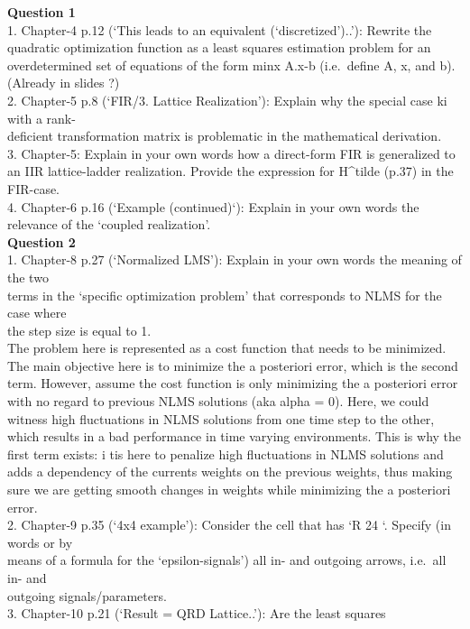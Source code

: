 \documentclass[
  a4paper,
  ,captions=tableheading
]{scrartcl}
\begin{document}
\textbf{Question 1}\\
1. Chapter-4 p.12 (`This leads to an equivalent (`discretized')..'):
Rewrite the quadratic optimization function as a least squares
estimation problem for an overdetermined set of equations of the form
minx \textbar\textbar A.x-b\textbar{} (i.e.~define A, x, and
b).\\
(Already in slides ?)\\
2. Chapter-5 p.8 (`FIR/3. Lattice Realization'): Explain why the special
case \textbar ki  with a rank-\\
deficient transformation matrix is problematic in the mathematical
derivation.\\
3. Chapter-5: Explain in your own words how a direct-form FIR is
generalized to an IIR lattice-ladder realization. Provide the expression
for H\^{}tilde (p.37) in the FIR-case.\\
4. Chapter-6 p.16 (`Example (continued)`): Explain in your own words the
relevance of the `coupled realization'.\\
\textbf{Question 2}\\
1. Chapter-8 p.27 (`Normalized LMS'): Explain in your own words the
meaning of the two\\
terms in the `specific optimization problem' that corresponds to NLMS
for the case where\\
the step size is equal to 1.\\
The problem here is represented as a cost function that needs to be
minimized. The main objective here is to minimize the a posteriori
error, which is the second term. However, assume the cost function is
only minimizing the a posteriori error with no regard to previous NLMS
solutions (aka alpha = 0). Here, we could witness high fluctuations in
NLMS solutions from one time step to the other, which results in a bad
performance in time varying environments. This is why the first term
exists: i tis here to penalize high fluctuations in NLMS solutions and
adds a dependency of the currents weights on the previous weights, thus
making sure we are getting smooth changes in weights while minimizing
the a posteriori error.\\
2. Chapter-9 p.35 (`4x4 example'): Consider the cell that has `R 24 `.
Specify (in words or by\\
means of a formula for the `epsilon-signals') all in- and outgoing
arrows, i.e.~all in- and\\
outgoing signals/parameters.\\
3. Chapter-10 p.21 (`Result = QRD Lattice..'): Are the least squares
\end{document}
